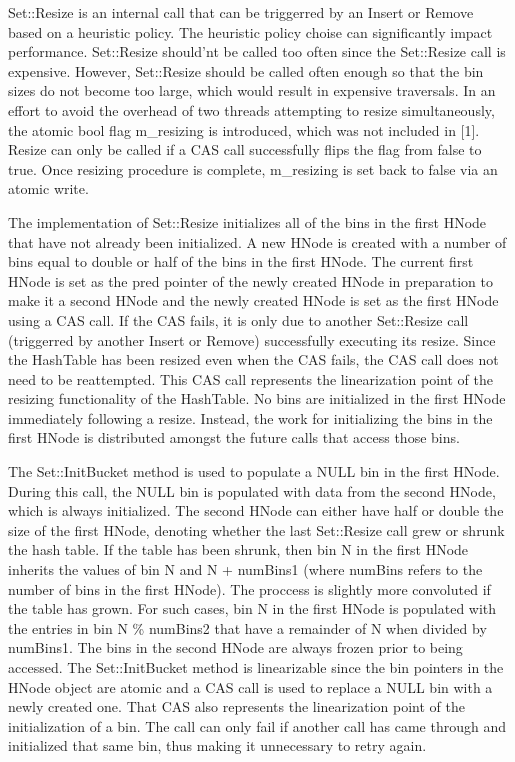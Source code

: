 \documentclass[11pt]{article} %
\begin{document}
Set::Resize is an internal call that can be triggerred by an Insert or Remove based on a heuristic policy. The heuristic policy choise can significantly impact performance. Set::Resize should'nt be called too often since the Set::Resize call is expensive. However, Set::Resize should be called often enough so that the bin sizes do not become too large, which would result in expensive traversals. In an effort to avoid the overhead of two threads attempting to resize simultaneously, the atomic bool flag m\_resizing is introduced, which was not included in [1]. Resize can only be called if a CAS call successfully flips the flag from false to true. Once resizing procedure is complete, m\_resizing is set back to false via an atomic write.

The implementation of Set::Resize initializes all of the bins in the first HNode that have not already been initialized. A new HNode is created with a number of bins equal to double or half of the bins in the first HNode. The current first HNode is set as the pred pointer of the newly created HNode in preparation to make it a second HNode and the newly created HNode is set as the first HNode using a CAS call. If the CAS fails, it is only due to another Set::Resize call (triggerred by another Insert or Remove) successfully executing its resize. Since the HashTable has been resized even when the CAS fails, the CAS call does not need to be reattempted. This CAS call represents the linearization point of the resizing functionality of the HashTable. No bins are initialized in the first HNode immediately following a resize. Instead, the work for initializing the bins in the first HNode is distributed amongst the future calls that access those bins.

The Set::InitBucket method is used to populate a NULL bin in the first HNode. During this call, the NULL bin is populated with data from the second HNode, which is always initialized. The second HNode can either have half or double the size of the first HNode, denoting whether the last Set::Resize call grew or shrunk the hash table. If the table has been shrunk, then bin N in the first HNode inherits the values of bin N and N + numBins1 (where numBins refers to the number of bins in the first HNode). The proccess is slightly more convoluted if the table has grown. For such cases, bin N in the first HNode is populated with the entries in bin N \% numBins2 that have a remainder of N when divided by numBins1. The bins in the second HNode are always frozen prior to being accessed. The Set::InitBucket method is linearizable since the bin pointers in the HNode object are atomic and a CAS call is used to replace a NULL bin with a newly created one. That CAS also represents the linearization point of the initialization of a bin. The call can only fail if another call has came through and initialized that same bin, thus making it unnecessary to retry again.
\end{document}
